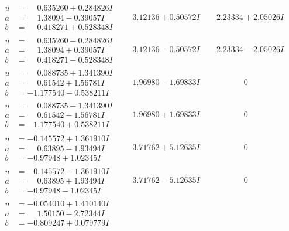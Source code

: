 \documentclass[1p]{elsarticle_modified}
\theoremstyle{definition}
\begin{document}
$$\begin{array}{c|c|c}
\begin{aligned}
u &= \phantom{-}0.635260 + 0.284826 I \\
a &= \phantom{-}1.38094 - 0.39057 I \\
b &= \phantom{-}0.418271 + 0.528348 I\end{aligned}
 & \phantom{-}3.12136 + 0.50572 I & \phantom{-}2.23334 + 2.05026 I \\ \hline\begin{aligned}
u &= \phantom{-}0.635260 - 0.284826 I \\
a &= \phantom{-}1.38094 + 0.39057 I \\
b &= \phantom{-}0.418271 - 0.528348 I\end{aligned}
 & \phantom{-}3.12136 - 0.50572 I & \phantom{-}2.23334 - 2.05026 I \\ \hline\begin{aligned}
u &= \phantom{-}0.088735 + 1.341390 I \\
a &= \phantom{-}0.61542 + 1.56781 I \\
b &= -1.177540 - 0.538211 I\end{aligned}
 & \phantom{-}1.96980 - 1.69833 I & \phantom{-0.000000 } 0 \\ \hline\begin{aligned}
u &= \phantom{-}0.088735 - 1.341390 I \\
a &= \phantom{-}0.61542 - 1.56781 I \\
b &= -1.177540 + 0.538211 I\end{aligned}
 & \phantom{-}1.96980 + 1.69833 I & \phantom{-0.000000 } 0 \\ \hline\begin{aligned}
u &= -0.145572 + 1.361910 I \\
a &= \phantom{-}0.63895 - 1.93494 I \\
b &= -0.97948 + 1.02345 I\end{aligned}
 & \phantom{-}3.71762 + 5.12635 I & \phantom{-0.000000 } 0 \\ \hline\begin{aligned}
u &= -0.145572 - 1.361910 I \\
a &= \phantom{-}0.63895 + 1.93494 I \\
b &= -0.97948 - 1.02345 I\end{aligned}
 & \phantom{-}3.71762 - 5.12635 I & \phantom{-0.000000 } 0 \\ \hline\begin{aligned}
u &= -0.054010 + 1.410140 I \\
a &= \phantom{-}1.50150 - 2.72344 I \\
b &= -0.809247 + 0.079779 I\end{aligned}

\end{array}$$
\end{document}
